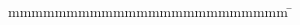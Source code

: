 \begin{titlepage}
\enlargethispage{20mm}
\vspace{10mm}

\begin{center}
	\doublespacing
	\vspace*{35mm}	
	\begin{minipage}{.7\textwidth}
		\centering
		{\Large{\titel}}
	\end{minipage}																				\\
	\vspace*{10mm}		{\textbf{\MakeUppercase{\arbeit}}}										\\
	\onehalfspacing
	\vfill
	\vspace*{15mm}	    \langvon															\\
	\vspace*{3mm}		{\large\textbf \autor}												\\
	\vspace*{12mm}	    \datumAbgabe														\\
\end{center}

\vspace{15mm}

\flushleft
\begin{spacing}{1.2}
\begin{tabbing}
		mmmmmmmmmmmmmmmmmmmmmmmm              \= \kill
		\textbf{\langdbbetreuer} %
								\> \betreuer\\
		\textbf{\langdbgutachter}              \>  \gutachter\\
\end{tabbing}
\end{spacing}

\vspace{1cm}
\restoregeometry
\end{titlepage}